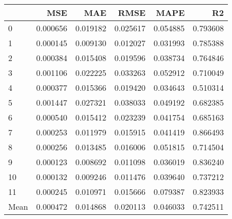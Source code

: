 \begin{tabular}{lrrrrr}
\toprule
 & MSE & MAE & RMSE & MAPE & R2 \\
\midrule
0 & 0.000656 & 0.019182 & 0.025617 & 0.054885 & 0.793608 \\
1 & 0.000145 & 0.009130 & 0.012027 & 0.031993 & 0.785388 \\
2 & 0.000384 & 0.015408 & 0.019596 & 0.038734 & 0.764846 \\
3 & 0.001106 & 0.022225 & 0.033263 & 0.052912 & 0.710049 \\
4 & 0.000377 & 0.015366 & 0.019420 & 0.034643 & 0.510314 \\
5 & 0.001447 & 0.027321 & 0.038033 & 0.049192 & 0.682385 \\
6 & 0.000540 & 0.015412 & 0.023239 & 0.041754 & 0.685163 \\
7 & 0.000253 & 0.011979 & 0.015915 & 0.041419 & 0.866493 \\
8 & 0.000256 & 0.013485 & 0.016006 & 0.051815 & 0.714504 \\
9 & 0.000123 & 0.008692 & 0.011098 & 0.036019 & 0.836240 \\
10 & 0.000132 & 0.009246 & 0.011476 & 0.039640 & 0.737212 \\
11 & 0.000245 & 0.010971 & 0.015666 & 0.079387 & 0.823933 \\
Mean & 0.000472 & 0.014868 & 0.020113 & 0.046033 & 0.742511 \\
\bottomrule
\end{tabular}
